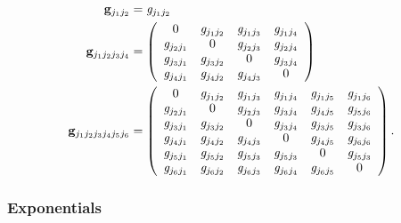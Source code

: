 \documentclass[aps,preprint]{revtex4}%
\begin{document}
\begin{align}
\mathbf{g}_{j_{1}j_{2}}  &  =\mathit{g}_{j_{1}j_{2}}\\
\mathbf{g}_{j_{1}j_{2}j_{3}j_{4}}  &  =\left(
\begin{array}
[c]{cccc}%
0 & \mathit{g}_{j_{1}j_{2}} & \mathit{g}_{j_{1}j_{3}} & \mathit{g}_{j_{1}%
j_{4}}\\
\mathit{g}_{j_{2}j_{1}} & 0 & \mathit{g}_{j_{2}j_{3}} & \mathit{g}_{j_{2}%
j_{4}}\\
\mathit{g}_{j_{3}j_{1}} & \mathit{g}_{j_{3}j_{2}} & 0 & \mathit{g}_{j_{3}%
j_{4}}\\
\mathit{g}_{j_{4}j_{1}} & \mathit{g}_{j_{4}j_{2}} & \mathit{g}_{j_{4}j_{3}} &
0
\end{array}
\right) \\
\mathbf{g}_{j_{1}j_{2}j_{3}j_{4}j_{5}j_{6}}  &  =\left(
\begin{array}
[c]{cccccc}%
0 & \mathit{g}_{j_{1}j_{2}} & \mathit{g}_{j_{1}j_{3}} & \mathit{g}_{j_{1}%
j_{4}} & \mathit{g}_{j_{1}j_{5}} & \mathit{g}_{j_{1}j_{6}}\\
\mathit{g}_{j_{2}j_{1}} & 0 & \mathit{g}_{j_{2}j_{3}} & \mathit{g}_{j_{3}%
j_{4}} & \mathit{g}_{j_{4}j_{5}} & \mathit{g}_{j_{5}j_{6}}\\
\mathit{g}_{j_{3}j_{1}} & \mathit{g}_{j_{3}j_{2}} & 0 & \mathit{g}_{j_{3}%
j_{4}} & \mathit{g}_{j_{3}j_{5}} & \mathit{g}_{j_{3}j_{6}}\\
\mathit{g}_{j_{4}j_{1}} & \mathit{g}_{j_{4}j_{2}} & \mathit{g}_{j_{4}j_{3}} &
0 & \mathit{g}_{j_{4}j_{5}} & \mathit{g}_{j_{6}j_{6}}\\
\mathit{g}_{j_{5}j_{1}} & \mathit{g}_{j_{5}j_{2}} & \mathit{g}_{j_{5}j_{3}} &
\mathit{g}_{j_{5}j_{3}} & 0 & \mathit{g}_{j_{5}j_{3}}\\
\mathit{g}_{j_{6}j_{1}} & \mathit{g}_{j_{6}j_{2}} & \mathit{g}_{j_{6}j_{3}} &
\mathit{g}_{j_{6}j_{4}} & \mathit{g}_{j_{6}j_{5}} & 0
\end{array}
\right)  .
\end{align}


\subsubsection{Exponentials}%
\end{document}
